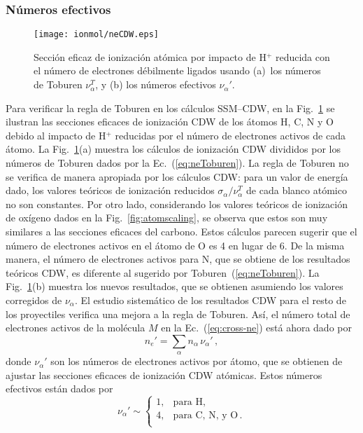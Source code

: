 \subsubsection{Números efectivos}
\label{subsec:CDW}

\begin{figure}[t]
\centering
\texttt{[image: ionmol/neCDW.eps]}
\caption[Sección eficaz de ionización atómica reducida por $n_e$.]
{Sección eficaz de ionización atómica por impacto de H$^+$ reducida con 
el número de electrones débilmente ligados usando 
(a)~los números de Toburen $\nu_{\alpha}^T$, y 
(b) los números efectivos $\nu_{\alpha}'$.}
\label{fig:neCDW}
\end{figure}

Para verificar la regla de Toburen en los cálculos SSM--CDW, 
en la Fig.~\ref{fig:neCDW} se ilustran las secciones eficaces de 
ionización CDW de los átomos H, C, N y O debido al impacto de H$^+$ 
reducidas por el número de electrones activos de cada átomo. La 
Fig.~\ref{fig:neCDW}(a) muestra los cálculos de ionización CDW divididos 
por los números de Toburen dados por la Ec.~(\ref{eq:neToburen}). La 
regla de Toburen no se verifica de manera apropiada por los cálculos 
CDW: para un valor de energía dado, los valores teóricos de ionización 
reducidos $\sigma_{\alpha}/\nu_{\alpha}^T$ de cada blanco atómico no son 
constantes. Por otro lado, considerando los valores teóricos de 
ionización de oxígeno dados en la Fig.~\ref{fig:atomscaling}, se observa 
que estos son muy similares a las secciones eficaces del carbono. Estos 
cálculos parecen sugerir que el número de electrones activos en el 
átomo de O es 4 en lugar de 6. De la misma manera, el número de 
electrones activos para N, que se obtiene de los resultados teóricos 
CDW, es diferente al sugerido por Toburen~(\ref{eq:neToburen}). 
La Fig.~\ref{fig:neCDW}(b) muestra los nuevos resultados, que se 
obtienen asumiendo los valores corregidos de $\nu_{\alpha}$. El estudio 
sistemático de los resultados CDW para el resto de los proyectiles 
verifica una mejora a la regla de Toburen. Así, el número total de 
electrones activos de la molécula $M$ en la Ec.~(\ref{eq:cross-ne}) está 
ahora dado por 
\begin{equation}
n_e'=\sum_{\alpha}n_{\alpha}\,\nu_{\alpha}'\,,
\label{eq:neprima}
\end{equation}
donde $\nu_{\alpha}'$ son los números de electrones activos 
por átomo, que se obtienen de ajustar las secciones eficaces de 
ionización CDW atómicas. Estos números efectivos están dados por
\begin{equation}
\nu_{\alpha }' \sim\left\{ 
\begin{array}{ll}
1, & \text{para H,} \\
4, & \text{para C, N, y O}\,. \\ 
\end{array}
\right. 
\label{eq:neCDW}
\end{equation}

